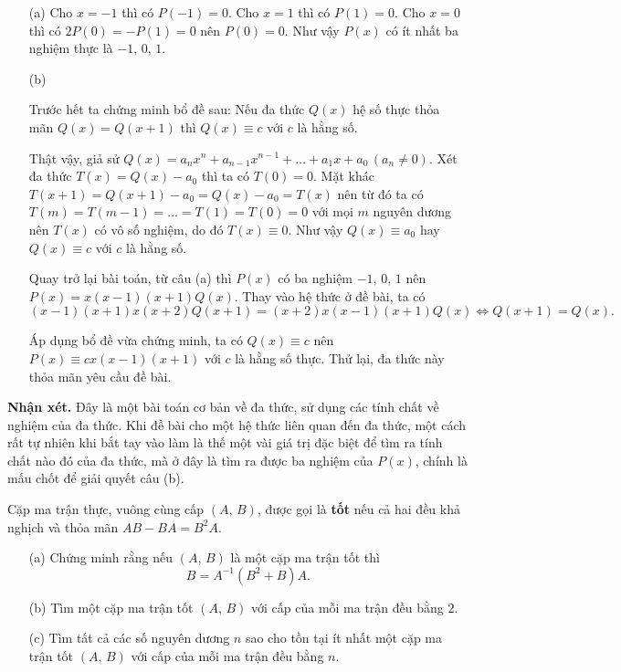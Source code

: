 \begin{enumerate}
    \item[(a)] {
        Cho $x = -1$ thì có $P(-1) = 0$. Cho $x = 1$ thì có $P(1) = 0$. Cho $x = 0$ thì có $2P(0) = -P(1) = 0$ nên $P(0) = 0$. Như vậy $P(x)$ có ít nhất ba nghiệm thực là $-1,\,0,\,1$.
    } 
    \item[(b)] {Trước hết ta chứng minh bổ đề sau: Nếu đa thức $Q(x)$ hệ số thực thỏa mãn $Q(x) = Q(x+1)$ thì $Q(x) \equiv c$ với $c$ là hằng số.
    
    Thật vậy, giả sử $Q(x) = a_nx^n + a_{n-1}x^{n-1} + \ldots + a_1x + a_0\,(a_n \ne 0)$. Xét đa thức $T(x) = Q(x) - a_0$ thì ta có $T(0) = 0$. Mặt khác $T(x+1) = Q(x+1) - a_0 = Q(x) - a_0 = T(x)$ nên từ đó ta có $T(m) = T(m-1) = \ldots = T(1) = T(0) = 0$ với mọi $m$ nguyên dương nên $T(x)$ có vô số nghiệm, do đó $T(x) \equiv 0$. Như vậy $Q(x) \equiv a_0$ hay $Q(x) \equiv c$ với $c$ là hằng số.
    
    Quay trở lại bài toán, từ câu (a) thì $P(x)$ có ba nghiệm $-1,\,0,\,1$ nên $P(x) = x(x-1)(x+1)Q(x)$. Thay vào hệ thức ở đề bài, ta có $$(x-1)(x+1)x(x+2)Q(x+1) = (x+2)x(x-1)(x+1)Q(x) \iff Q(x+1) = Q(x).$$
    
    Áp dụng bổ đề vừa chứng minh, ta có $Q(x)\equiv c$ nên $P(x) \equiv cx(x-1)(x+1)$ với $c$ là hằng số thực. Thử lại, đa thức này thỏa mãn yêu cầu đề bài.} 
\end{enumerate}

\textbf{Nhận xét. }Đây là một bài toán cơ bản về đa thức, sử dụng các tính chất về nghiệm của đa thức. Khi đề bài cho một hệ thức liên quan đến đa thức, một cách rất tự nhiên khi bắt tay vào làm là thế một vài giá trị đặc biệt để tìm ra tính chất nào đó của đa thức, mà ở đây là tìm ra được ba nghiệm của $P(x)$, chính là mấu chốt để giải quyết câu (b).

\begin{tcolorbox}[title=\textbf{Bài toán A.5.},breakable]
    Cặp ma trận thực, vuông cùng cấp $(A,\,B)$, được gọi là \textbf{tốt} nếu cả hai đều khả nghịch và thỏa mãn $AB-BA = B^2A$.
    \begin{enumerate}
        \item[(a)] {Chứng minh rằng nếu $(A,\,B)$ là một cặp ma trận tốt thì $$B = A^{-1}(B^2+B)A.$$}
        \item[(b)] {Tìm một cặp ma trận tốt $(A,\,B)$ với cấp của mỗi ma trận đều bằng 2.}
        \item[(c)] {Tìm tất cả các số nguyên dương $n$ sao cho tồn tại ít nhất một cặp ma trận tốt $(A,\,B)$ với cấp của mỗi ma trận đều bằng $n$.} 
    \end{enumerate}
\end{tcolorbox}


